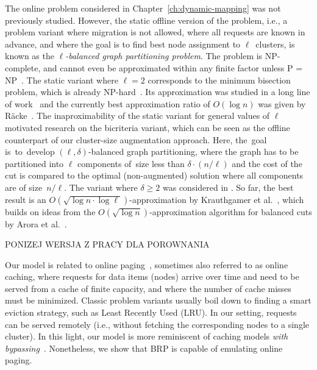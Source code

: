 The online problem considered in Chapter~\ref{ch:dynamic-mapping} was not previously studied.
However, the static offline version of the problem, i.e., a problem variant where
migration is not allowed, where all requests are known in advance, and where
the goal is to find best node assignment to $\ell$~clusters, is known as the
\emph{$\ell$-balanced graph partitioning problem}. The problem is 
NP-complete, and cannot even be approximated within any finite factor unless P
= NP~\cite{AndRae06}.  The static
variant where $\ell = 2$ corresponds to the minimum bisection problem, which
is already NP-hard~\cite{GaJoSt76}.
Its approximation was studied in a long
line of work~\cite{SarVaz95,ArKaKa99,FeKrNi00,FeiKra02,KraFei06,Raec08} and
the currently best approximation ratio of $O(\log n)$ was given by
R{\"{a}}cke~\cite{Raec08}.
The inaproximability of the static variant for general values of $\ell$
motivated research on the bicriteria variant, which can be seen as the offline
counterpart of our cluster-size augmentation approach. Here, the~goal
is~to~develop $(\ell,\delta)$-balanced graph partitioning, where the graph has
to be partitioned into $\ell$ components of~size less than $\delta \cdot (n /
\ell)$ and the cost of the cut is compared to the optimal (non-augmented)
solution where all components are of size~$n / \ell$. The variant where
$\delta \geq 2$ was considered in
\cite{LeMaTr90,SimTen97,EvNaRS00,EvNaRS99,KrNaSc09}. So far, the best result is
an $O(\!\sqrt{\log n \cdot \log \ell})$-approximation by Krauthgamer et
al.~\cite{KrNaSc09}, which builds on ideas from the $O(\!\sqrt{\log
n})$-approximation algorithm for balanced cuts by Arora et al.~\cite{ArRaVa09}.

\begin{large}
  PONIZEJ WERSJA Z PRACY DLA POROWNANIA
\end{large}

Our model is related to online
paging~\cite{SleTar85,FKLMSY91,McGSle91,AcChNo00}, sometimes also referred to
as online caching, where requests for data items (nodes) arrive over time and
need to be served from a cache of finite capacity, and where the number of
cache misses must be minimized. Classic problem variants usually boil down to
finding a smart eviction strategy, such as Least Recently Used (LRU). In our
setting, requests can be served remotely (i.e., without fetching the
corresponding nodes to a single cluster). In this light, our model is more
reminiscent of caching models \emph{with
bypassing}~\cite{EpImLN11,EpImLN15,Irani02}. Nonetheless, we show that BRP is
capable of emulating online paging.

